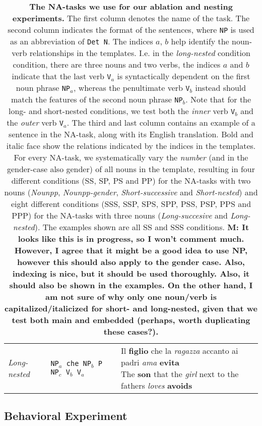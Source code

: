 \begin{table}
\begin{tabular}{lll}
\emph{Long-nested} & \texttt{NP$_a$ che NP$_b$ P NP$_c$ V$_b$ V$_a$} & \specialcell{Il \textbf{figlio} che la \emph{ragazza} accanto ai padri \emph{ama} \textbf{evita}\vspace{-3mm}\\{\scriptsize The \textbf{son} that the \emph{girl} next to the fathers \emph{loves} \textbf{avoids}}} \\
\end{tabular}
\caption{\textbf{The NA-tasks we use for our ablation and nesting experiments.}
The first column denotes the name of the task.
The second column indicates the format of the sentences, where \texttt{NP} is used as an abbreviation of \texttt{Det N}.
The indices $a$, $b$ help identify the noun-verb relationships in the templates.
I.e. in the \emph{long-nested} condition condition, there are three nouns and two verbs, the indices $a$ and $b$ indicate that the last verb \texttt{V$_a$} is syntactically dependent on the first noun phrase \texttt{NP$_a$}, whereas the penultimate verb \texttt{V$_b$} instead should match the features of the second noun phrase \texttt{NP$_b$}.
Note that for the long- and short-nested conditions, we test both the \emph{inner} verb \texttt{V$_b$} and the \emph{outer} verb \texttt{V$_a$}.
The third and last column contains an example of a sentence in the NA-task, along with its English translation.
Bold and italic face show the relations indicated by the indices in the templates.
For every NA-task, we systematically vary the \emph{number} (and in the gender-case also gender) of all nouns in the template, resulting in four different conditions (SS, SP, PS and PP) for the NA-tasks with two nouns (\emph{Nounpp}, \emph{Nounpp-gender}, \emph{Short-successive} and \emph{Short-nested}) and eight different conditions (SSS, SSP, SPS, SPP, PSS, PSP, PPS and PPP) for the NA-tasks with three nouns (\emph{Long-succesive} and \emph{Long-nested}).
The examples shown are all SS and SSS conditions.
\textbf{M: It looks like this is in progress, so I won't comment much. However, I agree that it might be a good idea to use NP, however this should also apply to the gender case. Also, indexing is nice, but it should be used thoroughly. Also, it should also be shown in the examples. On the other hand, I am not sure of why only one noun/verb is capitalized/italicized for short- and long-nested, given that we test both main and embedded (perhaps, worth duplicating these cases?).}
}
\end{table}

\subsection{Behavioral Experiment}
